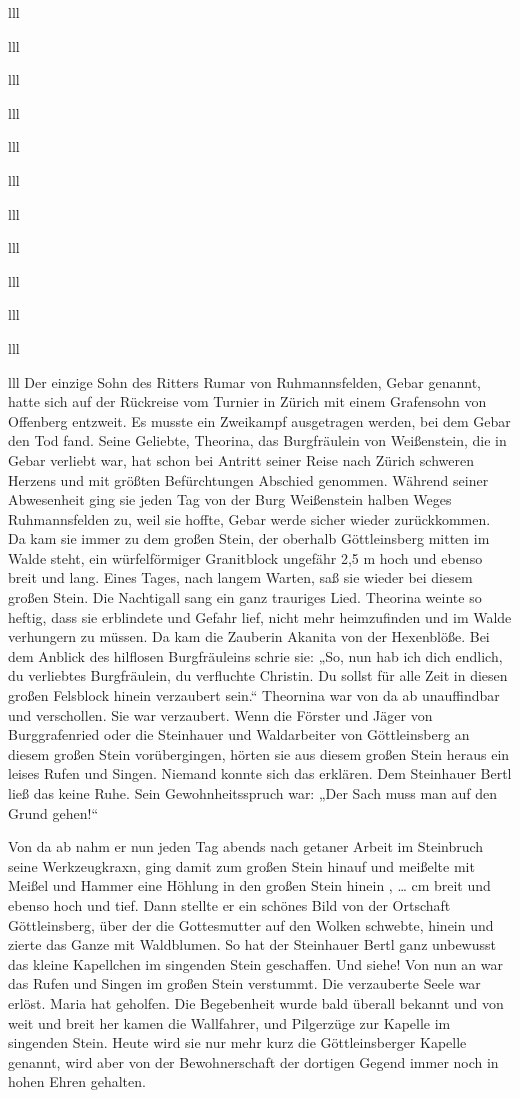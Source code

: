 \documentclass[12pt,a4pager]{book}
\begin{document}
\begin{tabuluar}{lll}
\begin{tabuluar}{lll}
\begin{tabuluar}{lll}
\begin{tabuluar}{lll}
\begin{tabuluar}{lll}
\begin{tabuluar}{lll}
\begin{tabuluar}{lll}
\begin{tabuluar}{lll}
\begin{tabuluar}{lll}
\begin{tabuluar}{lll}
\begin{tabuluar}{lll}
\begin{tabuluar}{lll}
Der einzige Sohn des Ritters Rumar von Ruhmannsfelden, Gebar genannt, hatte sich
auf der Rückreise vom Turnier in Zürich mit einem Grafensohn von Offenberg
entzweit. Es musste ein Zweikampf ausgetragen werden, bei dem Gebar den Tod
fand. Seine Geliebte, Theorina, das Burgfräulein von Weißenstein, die in Gebar
verliebt war, hat schon bei Antritt seiner Reise nach Zürich schweren Herzens
und mit größten Befürchtungen Abschied genommen. Während seiner Abwesenheit ging
sie jeden Tag von der Burg Weißenstein halben Weges Ruhmannsfelden zu, weil sie
hoffte, Gebar werde sicher wieder zurückkommen. Da kam sie immer zu dem großen
Stein, der oberhalb Göttleinsberg mitten im Walde steht, ein würfelförmiger
Granitblock ungefähr 2,5 m hoch und ebenso breit und lang. Eines Tages, nach
langem Warten, saß sie wieder bei diesem großen Stein. Die Nachtigall sang ein
ganz trauriges Lied. Theorina weinte so heftig, dass sie erblindete und Gefahr
lief, nicht mehr heimzufinden und im Walde verhungern zu müssen. Da kam die
Zauberin Akanita von der Hexenblöße. Bei dem Anblick des hilflosen Burgfräuleins
schrie sie: „So, nun hab ich dich endlich, du verliebtes Burgfräulein, du
verfluchte Christin. Du sollst für alle Zeit in diesen großen Felsblock hinein
verzaubert sein.“ Theornina war von da ab unauffindbar und verschollen. Sie war
verzaubert. Wenn die Förster und Jäger von Burggrafenried oder die Steinhauer
und Waldarbeiter von Göttleinsberg an diesem großen Stein vorübergingen, hörten
sie aus diesem großen Stein heraus ein leises Rufen und Singen. Niemand konnte
sich das erklären. Dem Steinhauer Bertl ließ das keine Ruhe. Sein
Gewohnheitsspruch war: „Der Sach muss man auf den Grund gehen!“

Von da ab nahm er nun jeden Tag abends nach getaner Arbeit im Steinbruch seine
Werkzeugkraxn, ging damit zum großen Stein hinauf und meißelte mit Meißel und
Hammer eine Höhlung in den großen Stein hinein , … cm breit und ebenso hoch und
tief. Dann stellte er ein schönes Bild von der Ortschaft Göttleinsberg, über der
die Gottesmutter auf den Wolken schwebte, hinein und zierte das Ganze mit
Waldblumen. So hat der Steinhauer Bertl ganz unbewusst das kleine Kapellchen im
singenden Stein geschaffen. Und siehe! Von nun an war das Rufen und Singen im
großen Stein verstummt. Die verzauberte Seele war erlöst. Maria hat geholfen.
Die Begebenheit wurde bald überall bekannt und von weit und breit her kamen die
Wallfahrer, und Pilgerzüge zur Kapelle im singenden Stein. Heute wird sie nur
mehr kurz die Göttleinsberger Kapelle genannt, wird aber von der Bewohnerschaft
der dortigen Gegend immer noch in hohen Ehren gehalten.


\end{tabuluar}
\end{tabuluar}
\end{tabuluar}
\end{tabuluar}
\end{tabuluar}
\end{tabuluar}
\end{tabuluar}
\end{tabuluar}
\end{tabuluar}
\end{tabuluar}
\end{tabuluar}
\end{tabuluar}
\end{document}
